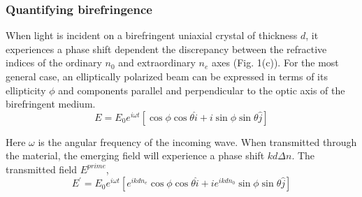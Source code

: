 \documentclass[12pt]{article}
\begin{document}
\subsubsection*{Quantifying birefringence}
When light is incident on a birefringent uniaxial crystal of thickness $d$, it experiences
a phase shift dependent the discrepancy between the refractive indices of the ordinary $n_{0}$ and
extraordinary $n_{e}$ axes (Fig. 1(c)). For the most general case, an elliptically polarized beam 
can be expressed in terms of its ellipticity 
$\phi$ and components parallel and perpendicular to the optic axis of the birefringent medium.
\begin{equation}
E=E_{0}e^{i\omega t}[\cos\phi\cos\theta\hat{i}+i\sin\phi\sin\theta\hat{j}]
\end{equation}


Here $\omega$ is the angular frequency of the incoming wave. When
transmitted through the material, the emerging field will experience
a phase shift $kd\Delta n$. The transmitted field $E^{prime}$, 
\begin{equation}
E^{\prime}=E_{0}e^{i\omega t}[e^{ikdn_{e}}\cos\phi\cos\theta\hat{i}+ie^{ikdn_{0}}\sin\phi\sin\theta\hat{j}]
\end{equation}
\end{document}
